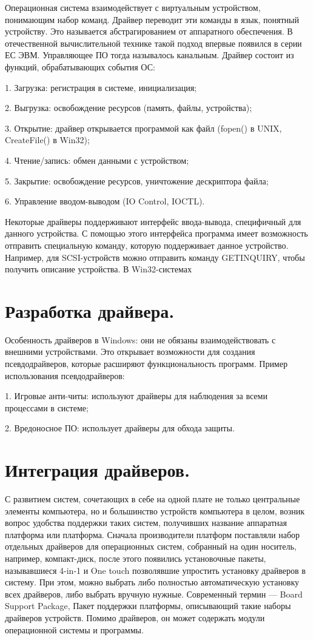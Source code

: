 \documentclass[14pt]{extarticle} %
\begin{document}
Операционная система взаимодействует с виртуальным устройством, понимающим набор команд. Драйвер переводит эти команды в язык, понятный устройству. Это называется абстрагированием от аппаратного обеспечения.
В отечественной вычислительной технике такой подход впервые появился в серии ЕС ЭВМ. Управляющее ПО тогда называлось канальным.
Драйвер состоит из функций, обрабатывающих события ОС:

1.	Загрузка: регистрация в системе, инициализация;

2.	Выгрузка: освобождение ресурсов (память, файлы, устройства);

3.	Открытие: драйвер открывается программой как файл (fopen() в UNIX, CreateFile() в Win32);

4.	Чтение/запись: обмен данными с устройством;

5.	Закрытие: освобождение ресурсов, уничтожение дескриптора файла;

6.	Управление вводом-выводом (IO Control, IOCTL).

Некоторые драйверы поддерживают интерфейс ввода-вывода, специфичный для данного устройства. С помощью этого интерфейса программа имеет возможность отправить специальную команду, которую поддерживает данное устройство. Например, для SCSI-устройств можно отправить команду GETINQUIRY, чтобы получить описание устройства. В Win32-системах

\section{Разработка драйвера.} \label{sec:eleven}

Особенность драйверов в Windows: они не обязаны взаимодействовать с внешними устройствами. Это открывает возможности для создания псевдодрайверов, которые расширяют функциональность программ. Пример использования псевдодрайверов:

1.	Игровые анти-читы: используют драйверы для наблюдения за всеми процессами в системе;

2.	Вредоносное ПО: использует драйверы для обхода защиты.

\section{Интеграция драйверов.} \label{sec:tvelwe}

С развитием систем, сочетающих в себе на одной плате не только центральные элементы компьютера, но и большинство устройств компьютера в целом, возник вопрос удобства поддержки таких систем, получивших название аппаратная платформа или платформа.
Сначала производители платформ поставляли набор отдельных драйверов для операционных систем, собранный на один носитель, например, компакт-диск, после этого появились установочные пакеты, называвшиеся 4-in-1 и One touch позволявшие упростить установку драйверов в систему. При этом, можно выбрать либо полностью автоматическую установку всех драйверов, либо выбрать вручную нужные. 
Современный термин — Board Support Package, Пакет поддержки платформы, описывающий такие наборы драйверов устройств. Помимо драйверов, он может содержать модули операционной системы и программы.
\end{document}
